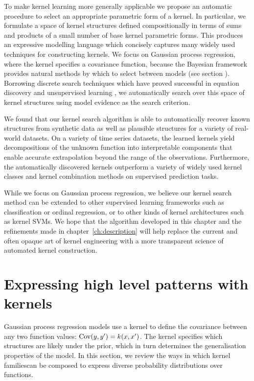 To make kernel learning more generally applicable we propose an automatic procedure to select an appropriate parametric form of a kernel.
In particular, we formulate a space of kernel structures defined compositionally in terms of sums and products of a small number of base kernel parametric forms.
This produces an expressive modelling language which concisely captures many widely used techniques for constructing kernels.
We focus on Gaussian process regression, where the kernel specifies a covariance function, because the Bayesian framework provides natural methods by which to select between models (see section ).
Borrowing discrete search techniques which have proved successful in equation discovery \cite{Todorovski1997-st} and unsupervised learning \cite{Grosse2012-zi}, we automatically search over this space of kernel structures using model evidence as the search criterion.

We found that our kernel search algorithm is able to automatically recover known structures from synthetic data as well as plausible structures for a variety of real-world datasets. 
On a variety of time series datasets, the learned kernels yield decompositions of the unknown function into interpretable components that enable accurate extrapolation beyond the range of the observations.
Furthermore, the automatically discovered kernels outperform a variety of widely used kernel classes and kernel combination methods on supervised prediction tasks.

While we focus on Gaussian process regression, we believe our kernel search method can be extended to other supervised learning frameworks such as classification or ordinal regression, or to other kinds of kernel architectures such as kernel SVMs.
We hope that the algorithm developed in this chapter and the refinements made in chapter~\ref{ch:description} will help replace the current and often opaque art of kernel engineering with a more transparent science of automated kernel construction.

\section{Expressing high level patterns with kernels} 
\label{sec:Structure}

Gaussian process regression models use a kernel to define the covariance between any two function values: ${\textrm{Cov}(y, y') = k(x,x')}$.
The kernel specifies which structures are likely under the \gp{} prior, which in turn determines the generalisation properties of the model.
In this section, we review the ways in which kernel families\footnotemark can be composed to express diverse probability distributions over functions. 

